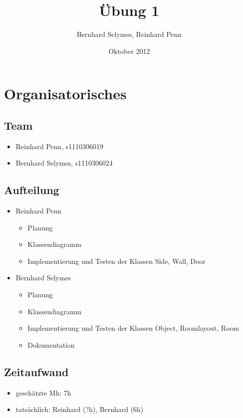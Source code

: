 \documentclass[12pt,a4paper]{article}
\begin{document}
\title{Übung 1}
\author{Bernhard Selymes, Reinhard Penn}
\date{Oktober 2012}

\normalsize

\newcommand{\CodePath}{../RoomLayout/RoomLayout/}

\section{Organisatorisches}

\subsection{Team}
	\begin {itemize} 
		\item Reinhard Penn, s1110306019 
		\item Bernhard Selymes, s1110306024
	\end {itemize}

\subsection{Aufteilung}
	\begin {itemize} 
		\item Reinhard Penn
			\begin {itemize}
				\item Planung
				\item Klassendiagramm
				\item Implementierung und Testen der Klassen Side, Wall, Door				
			\end {itemize}
		\item Bernhard Selymes
			\begin {itemize}
				\item Planung
				\item Klassendiagramm
				\item Implementierung und Testen der Klassen Object, Roomlayout, Room
				\item Dokumentation				
			\end {itemize}
	\end {itemize}


\subsection{Zeitaufwand}
	\begin {itemize}
		\item geschätzte Mh: 7h
		\item tatsächlich: Reinhard (?h), Bernhard  (6h)

	\end {itemize}
\end{document}
